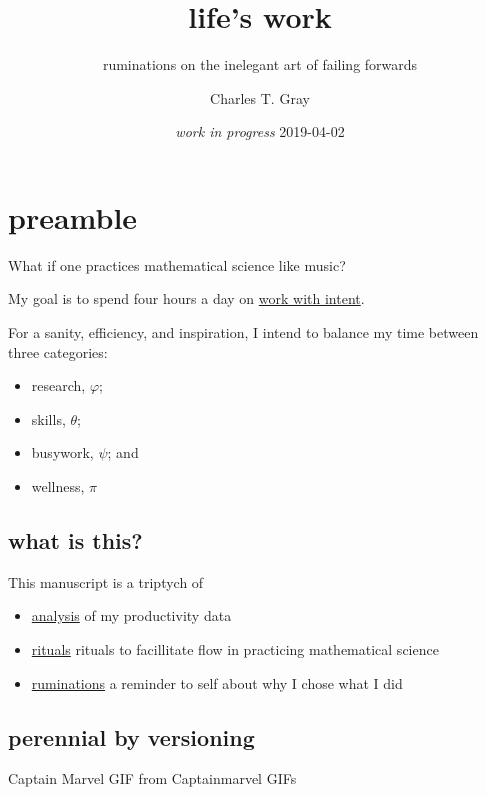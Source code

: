 \documentclass[]{book}
\title{life's work}
\subtitle{ruminations on the inelegant art of failing forwards}
\author{Charles T. Gray}
\date{\emph{work in progress} 2019-04-02}
\providecommand{\tightlist}{%
  \setlength{\itemsep}{0pt}\setlength{\parskip}{0pt}}
\begin{document}
\maketitle

{
\setcounter{tocdepth}{1}
\tableofcontents
}
\hypertarget{preamble}{%
\chapter{preamble}\label{preamble}}

What if one practices mathematical science like music?

My goal is to spend four hours a day on \protect\hyperlink{work-with-intent}{work with intent}.

For a sanity, efficiency, and inspiration, I intend to balance my time between three categories:

\begin{itemize}
\tightlist
\item
  research, \(\varphi\);
\item
  skills, \(\theta\);\\
\item
  busywork, \(\psi\); and
\item
  wellness, \(\pi\)
\end{itemize}

\hypertarget{what-is-this}{%
\section{what is this?}\label{what-is-this}}

This manuscript is a triptych of

\begin{itemize}
\tightlist
\item
  \protect\hyperlink{analysis}{analysis} of my productivity data
\item
  \protect\hyperlink{rituals}{rituals} rituals to facillitate flow in practicing mathematical science
\item
  \protect\hyperlink{ruminations}{ruminations} a reminder to self about why I chose what I did
\end{itemize}

\hypertarget{perennial-by-versioning}{%
\section{perennial by versioning}\label{perennial-by-versioning}}

Captain Marvel GIF from Captainmarvel GIFs
\end{document}
